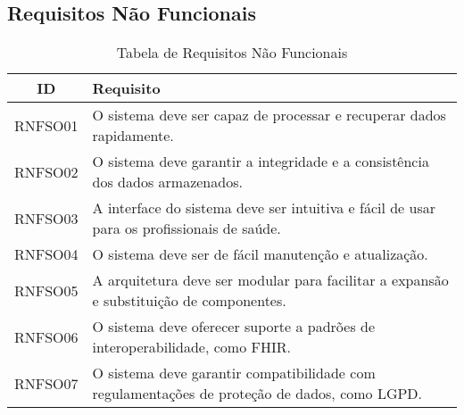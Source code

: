 \subsection{Requisitos Não Funcionais}
\begin{table}[H]
    \centering
    \begin{tabular}{|c|p{12cm}|}
    \hline
    \textbf{ID} & \textbf{Requisito} \\ \hline
    RNFSO01 & O sistema deve ser capaz de processar e recuperar dados rapidamente. \\ \hline
    RNFSO02 & O sistema deve garantir a integridade e a consistência dos dados armazenados. \\ \hline
    RNFSO03 & A interface do sistema deve ser intuitiva e fácil de usar para os profissionais de saúde. \\ \hline
    RNFSO04 & O sistema deve ser de fácil manutenção e atualização. \\ \hline
    RNFSO05 & A arquitetura deve ser modular para facilitar a expansão e substituição de componentes. \\ \hline
    RNFSO06 & O sistema deve oferecer suporte a padrões de interoperabilidade, como FHIR. \\ \hline
    RNFSO07 & O sistema deve garantir compatibilidade com regulamentações de proteção de dados, como LGPD. \\ \hline

    \end{tabular}
    \caption{Tabela de Requisitos Não Funcionais}
    \label{tab:requisitos_nao_funcionais}
\end{table}

